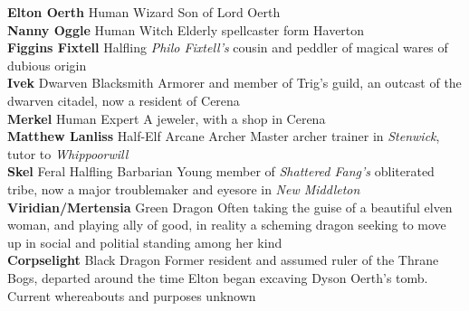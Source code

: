 \documentclass[letterpaper]{article}
\newcommand{\person}[3]{\noindent\textbf{#1
    \ifstrequal{#2}{M}{{\color{ProcessBlue}\male}}{%
    \ifstrequal{#2}{F}{\color{VioletRed}\female}{}}}{\scriptsize #3}}
\begin{document}
\indent\person{Elton Oerth}{M}{Human Wizard} Son of Lord Oerth \\
\indent\person{Nanny Oggle}{F}{Human Witch} Elderly spellcaster form Haverton \\
\indent\person{Figgins Fixtell}{M}{Halfling} \emph{Philo Fixtell's} cousin and peddler of magical wares of dubious origin \\
\person{Ivek}{M}{Dwarven Blacksmith} Armorer and member of Trig's guild, an outcast of the dwarven citadel, now a resident of Cerena \\
\person{Merkel}{F}{Human Expert} A jeweler, with a shop in Cerena \\
\person{Matthew Lanliss}{M}{Half-Elf Arcane Archer} Master archer trainer in \emph{Stenwick}, tutor to \emph{Whippoorwill} \\
\person{Skel}{M}{Feral Halfling Barbarian} Young member of \emph{Shattered Fang's} obliterated tribe, now a major troublemaker and eyesore in \emph{New Middleton} \\
\person{Viridian/Mertensia}{F}{Green Dragon} Often taking the guise of a beautiful elven woman, and playing ally of good, in reality a scheming dragon seeking to move up in social and politial standing among her kind \\
\person{Corpselight}{F}{Black Dragon} Former resident and assumed ruler of the Thrane Bogs, departed around the time Elton began excaving Dyson Oerth's tomb. Current whereabouts and purposes unknown \\
\end{document}
